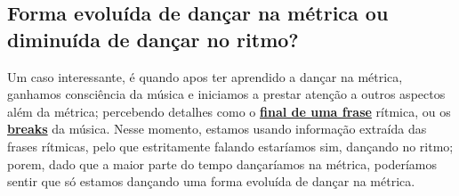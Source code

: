 \subsection{Forma evoluída de dançar na métrica ou diminuída de dançar no ritmo?}
Um caso interessante, é quando apos ter aprendido a dançar na métrica,
ganhamos consciência da música e iniciamos a prestar atenção a outros aspectos além da métrica;
percebendo detalhes como o \hyperref[sec:perceberfrases]{\textbf{final de uma frase}} rítmica, 
ou os \hyperref[sec:percepcionbreak]{\textbf{breaks}} da  música.
Nesse momento, estamos usando informação extraída das frases rítmicas, 
pelo que estritamente falando estaríamos sim,  dançando no ritmo; 
porem, dado que a maior parte do tempo dançaríamos na métrica,
 poderíamos sentir que só estamos dançando uma forma evoluída de dançar na métrica.


